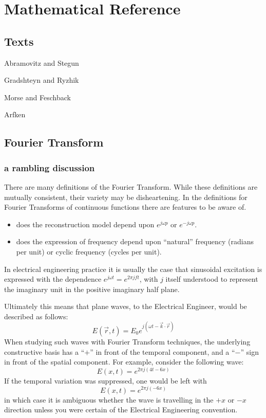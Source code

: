 \chapter{Mathematical Reference}

\section{Texts}

Abramovitz and Stegun

Gradshteyn and Ryzhik

Morse and Feschback

Arfken

\section{Fourier Transform}

\subsection{a rambling discussion}

There are many definitions of the Fourier Transform.  While these definitions are mutually consistent, 
their variety may be disheartening.  In the definitions for Fourier Transforms of continuous 
functions there are features to be aware of.  

\begin{itemize}
\item does the reconstruction model depend upon $e^{j\omega p}$ or $e^{-j\omega p}$.
\item does the expression of frequency depend upon ``natural'' frequency (radians per unit) or 
cyclic frequency (cycles per unit).
\end{itemize}

In electrical engineering practice it is usually the case that sinusoidal excitation is expressed with the
dependence $e^{j\omega t} = e^{2\pi j f t}$, with $j$ itself understood to represent the imaginary unit in 
the positive imaginary half plane.

Ultimately this means that plane waves, to the Electrical Engineer, would be described as follows:
\begin{displaymath}
E(\vec{r},t) = E_0 e^{j(\omega t - \vec{k}\cdot\vec{r})}
\end{displaymath}
When studying such waves with Fourier Transform techniques, the underlying constructive basis 
has a ``$+$'' in front of the temporal component, and a ``$-$'' sign in front of the spatial component.  
For example, consider the following wave:
\begin{displaymath}
E(x,t) = e^{2\pi j(4t - 6x)}
\end{displaymath}
If the temporal variation was suppressed, one would be left with 
\begin{displaymath}
E(x,t) = e^{2\pi j(- 6x)}
\end{displaymath}
in which case it is ambiguous whether the wave is travelling in the $+x$ or $-x$ direction unless you
were certain of the Electrical Engineering convention.

